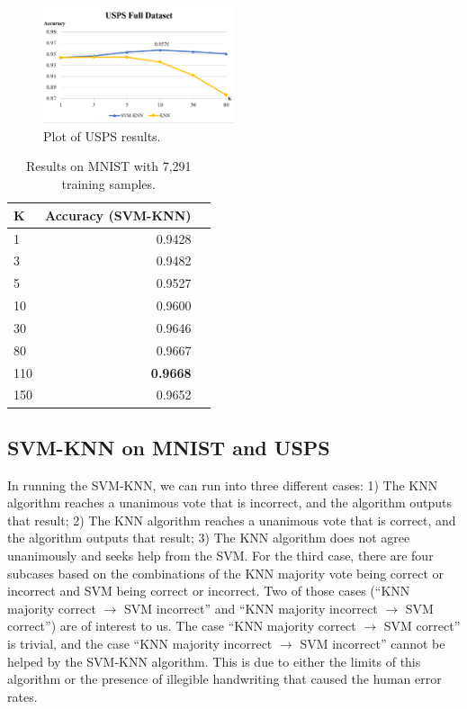 \documentclass[11pt,letterpaper]{article}
\begin{document}
\begin{figure}[t!]
  \centering
  \includegraphics[keepaspectratio, width=0.5\textwidth]{usps_full.png}
  \caption{Plot of USPS results.}
\end{figure}

\begin{table}
\begin{center}
\begin{tabular}{|l|r|r|}
\hline \bf K & \bf Accuracy (SVM-KNN) \\ \hline
1 & 0.9428 \\
3 & 0.9482 \\
5 & 0.9527 \\
10 & 0.9600 \\
30 & 0.9646 \\
80 & 0.9667 \\
110 & \textbf{0.9668} \\
150 & 0.9652 \\
\hline
\end{tabular}
\end{center}
\caption{\label{knn-mnist} Results on MNIST with 7,291 training samples. }
\end{table}

\subsection{SVM-KNN on MNIST and USPS}

In running the SVM-KNN, we can run into three different cases: 1) The KNN algorithm reaches a unanimous vote that is incorrect, and the algorithm outputs that result; 2) The KNN algorithm reaches a unanimous vote that is correct, and the algorithm outputs that result; 3) The KNN algorithm does not agree unanimously and seeks help from the SVM. For the third case, there are four subcases based on the combinations of the KNN majority vote being correct or incorrect and SVM being correct or incorrect. Two of those cases (``KNN majority correct $\rightarrow$ SVM incorrect'' and ``KNN majority incorrect $\rightarrow$ SVM correct'') are of interest to us. The case ``KNN majority correct $\rightarrow$ SVM correct'' is trivial, and the case ``KNN majority incorrect $\rightarrow$ SVM incorrect'' cannot be helped by the SVM-KNN algorithm. This is due to either the limits of this algorithm or the presence of illegible handwriting that caused the human error rates.
\end{document}
